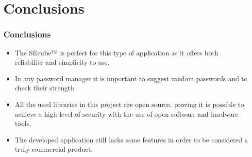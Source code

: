 \documentclass[14pt,usenames,dvipsnames]{beamer}
\begin{document}
\section{Conclusions}
\begin{frame}
	\frametitle{Conclusions}
	\begin{itemize}
		\setlength\itemsep{10pt}
		\item<1-> The SEcube™ is perfect for this type of application as it offers both reliability and simplicity to use.
		\item<2-> In any password manager it is important to suggest random passwords and to check their strength
		\item<3-> All the used libraries in this project are open source, proving it is possible to achieve a high level of security with the use of open software and hardware tools. 
		\item<4-> The developed application still lacks some features in order to be considered a truly commercial product.
	
	\end{itemize}
\end{frame}
\end{document}
